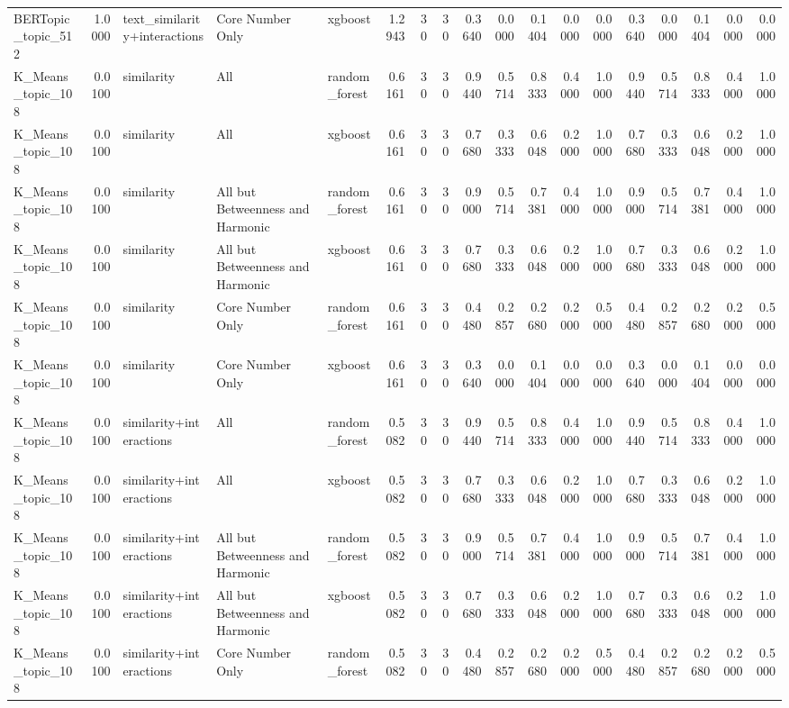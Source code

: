 \begin{tabular}{lrlllrrrrrrrrrrrrr}
BERTopic_topic_512 & 1.0000 & text_similarity+interactions & Core Number Only & xgboost & 1.2943 & 30 & 30 & 0.3640 & 0.0000 & 0.1404 & 0.0000 & 0.0000 & 0.3640 & 0.0000 & 0.1404 & 0.0000 & 0.0000 \\
K_Means_topic_108 & 0.0100 & similarity & All & random_forest & 0.6161 & 30 & 30 & 0.9440 & 0.5714 & 0.8333 & 0.4000 & 1.0000 & 0.9440 & 0.5714 & 0.8333 & 0.4000 & 1.0000 \\
K_Means_topic_108 & 0.0100 & similarity & All & xgboost & 0.6161 & 30 & 30 & 0.7680 & 0.3333 & 0.6048 & 0.2000 & 1.0000 & 0.7680 & 0.3333 & 0.6048 & 0.2000 & 1.0000 \\
K_Means_topic_108 & 0.0100 & similarity & All but Betweenness and Harmonic & random_forest & 0.6161 & 30 & 30 & 0.9000 & 0.5714 & 0.7381 & 0.4000 & 1.0000 & 0.9000 & 0.5714 & 0.7381 & 0.4000 & 1.0000 \\
K_Means_topic_108 & 0.0100 & similarity & All but Betweenness and Harmonic & xgboost & 0.6161 & 30 & 30 & 0.7680 & 0.3333 & 0.6048 & 0.2000 & 1.0000 & 0.7680 & 0.3333 & 0.6048 & 0.2000 & 1.0000 \\
K_Means_topic_108 & 0.0100 & similarity & Core Number Only & random_forest & 0.6161 & 30 & 30 & 0.4480 & 0.2857 & 0.2680 & 0.2000 & 0.5000 & 0.4480 & 0.2857 & 0.2680 & 0.2000 & 0.5000 \\
K_Means_topic_108 & 0.0100 & similarity & Core Number Only & xgboost & 0.6161 & 30 & 30 & 0.3640 & 0.0000 & 0.1404 & 0.0000 & 0.0000 & 0.3640 & 0.0000 & 0.1404 & 0.0000 & 0.0000 \\
K_Means_topic_108 & 0.0100 & similarity+interactions & All & random_forest & 0.5082 & 30 & 30 & 0.9440 & 0.5714 & 0.8333 & 0.4000 & 1.0000 & 0.9440 & 0.5714 & 0.8333 & 0.4000 & 1.0000 \\
K_Means_topic_108 & 0.0100 & similarity+interactions & All & xgboost & 0.5082 & 30 & 30 & 0.7680 & 0.3333 & 0.6048 & 0.2000 & 1.0000 & 0.7680 & 0.3333 & 0.6048 & 0.2000 & 1.0000 \\
K_Means_topic_108 & 0.0100 & similarity+interactions & All but Betweenness and Harmonic & random_forest & 0.5082 & 30 & 30 & 0.9000 & 0.5714 & 0.7381 & 0.4000 & 1.0000 & 0.9000 & 0.5714 & 0.7381 & 0.4000 & 1.0000 \\
K_Means_topic_108 & 0.0100 & similarity+interactions & All but Betweenness and Harmonic & xgboost & 0.5082 & 30 & 30 & 0.7680 & 0.3333 & 0.6048 & 0.2000 & 1.0000 & 0.7680 & 0.3333 & 0.6048 & 0.2000 & 1.0000 \\
K_Means_topic_108 & 0.0100 & similarity+interactions & Core Number Only & random_forest & 0.5082 & 30 & 30 & 0.4480 & 0.2857 & 0.2680 & 0.2000 & 0.5000 & 0.4480 & 0.2857 & 0.2680 & 0.2000 & 0.5000 \\

\end{tabular}

